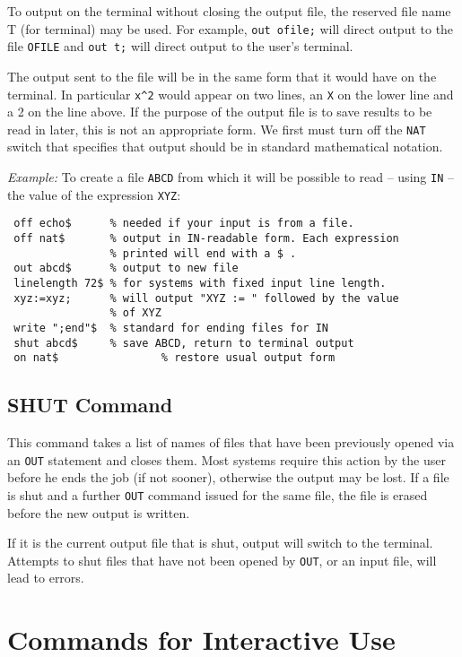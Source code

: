 To output on the terminal without closing the output file, the reserved
file name T (for terminal) may be used.  For example,
{\tt out ofile;} will direct output to the file {\tt OFILE} and
{\tt out t;} will direct output to the user's terminal.

The output sent to the file will be in the same form that it would have on
the terminal.  In particular {\tt x\verb|^|2} would appear on two lines, an
{\tt X} on the lower line and a 2 on the line above.  If the purpose of the
output file is to save results to be read in later, this is not an
appropriate form.  We first must turn off the {\tt NAT} switch that
specifies that output should be in standard mathematical notation.

{\it Example:} To create a file {\tt ABCD} from which it will be possible
to read -- using {\tt IN} -- the value of the expression {\tt XYZ}:
\begin{verbatim}
 off echo$      % needed if your input is from a file.
 off nat$       % output in IN-readable form. Each expression
                % printed will end with a $ .
 out abcd$      % output to new file
 linelength 72$ % for systems with fixed input line length.
 xyz:=xyz;      % will output "XYZ := " followed by the value
                % of XYZ
 write ";end"$  % standard for ending files for IN
 shut abcd$     % save ABCD, return to terminal output
 on nat$                % restore usual output form
\end{verbatim}

\section{SHUT Command}
This command takes a list of names of files that have been previously
opened via an {\tt OUT} statement and closes them. Most systems require this
action by the user before he ends the {\REDUCE} job (if not sooner),
otherwise the output may be lost. If a file is shut and a further {\tt OUT}
command issued for the same file, the file is erased before the new output
is written.

If it is the current output file that is shut, output will switch to the
terminal.  Attempts to shut files that have not been opened by {\tt OUT},
or an input file, will lead to errors.

\chapter{Commands for Interactive Use}

